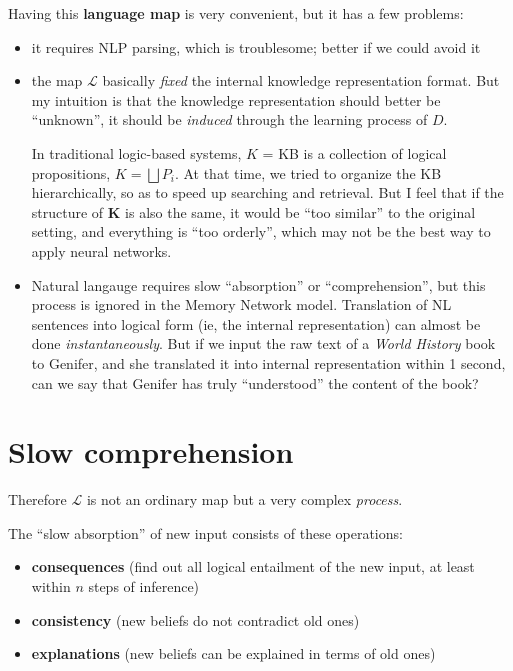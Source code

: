 \documentclass[12pt]{article}
\begin{document}
Having this \textbf{language map} is very convenient, but it has a few problems:
\begin{itemize}

\item it requires NLP parsing, which is troublesome; better if we could avoid it

\item the map $\mathcal{L}$ basically \textit{fixed} the internal knowledge representation format.  But my intuition is that the knowledge representation should better be ``unknown'', it should be \textit{induced} through the learning process of $D$.

In traditional logic-based systems, $K$ = KB is a collection of logical propositions, $ K = \bigsqcup P_i $.  At that time, we tried to organize the KB hierarchically, so as to speed up searching and retrieval.  But I feel that if the structure of $\mathbf{K}$ is also the same, it would be ``too similar'' to the original setting, and everything is ``too orderly'', which may not be the best way to apply neural networks.

\item Natural langauge requires slow ``absorption'' or ``comprehension'', but this process is ignored in the Memory Network model.  Translation of NL sentences into logical form (ie, the internal representation) can almost be done \textit{instantaneous\-ly}.  But if we input the raw text of a \textit{World History} book to Genifer, and she translated it into internal representation within 1 second, can we say that Genifer has truly ``understood'' the content of the book?

\end{itemize}

\section{Slow comprehension}

Therefore $\mathcal{L}$ is not an ordinary map but a very complex \textit{process}.

The ``slow absorption'' of new input consists of these operations:
\begin{itemize}
\item \textbf{consequences} (find out all logical entailment of the new input, at least within $n$ steps of inference)
\item \textbf{consistency} (new beliefs do not contradict old ones)
\item \textbf{explanations} (new beliefs can be explained in terms of old ones)
\end{itemize}
\end{document}
